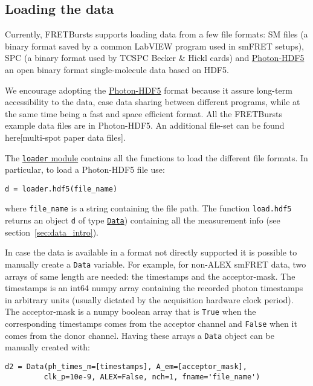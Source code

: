 \subsection{Loading the data}
Currently, FRETBursts supports loading data from a few file formats: SM files (a binary format saved by a common LabVIEW program used in smFRET setups), SPC (a binary format used by TCSPC Becker \& Hickl cards) and \href{http://photon-hdf5.readthedocs.org/}{Photon-HDF5}  an open binary format single-molecule data based on HDF5.

We encourage adopting the  \href{http://photon-hdf5.readthedocs.org/}{Photon-HDF5} format because it assure long-term accessibility to the data, ease data sharing  between different programs, while at the same time being a fast and space efficient format. All the FRETBursts example data files are in Photon-HDF5. An additional file-set can be found here[multi-spot paper data files].

The \href{http://fretbursts.readthedocs.org/en/latest/loader.html}{\texttt{loader} module}
contains all the functions to load the different file formats. In particular, to load a Photon-HDF5 file use:

\begin{verbatim}
d = loader.hdf5(file_name)
\end{verbatim}

where \verb|file_name| is a string containing the file path. The function \verb|load.hdf5| returns an object \verb|d| of type \href{http://fretbursts.readthedocs.org/en/latest/data_class.html}{\texttt{Data}}) containing all the measurement info (see section~\ref{sec:data_intro}).

In case the data is available in a format not directly supported it is possible to manually create a \verb|Data| variable. For example, for non-ALEX smFRET data, two arrays of same length are needed: the timestamps and the acceptor-mask. The timestamps is an int64 numpy array containing the recorded photon timestamps in arbitrary units (usually dictated by the acquisition hardware clock period). The acceptor-mask is a numpy boolean array that is \verb|True| when the corresponding timestamps comes from the acceptor channel and \verb|False| when it comes from the donor channel. Having these arrays a \verb|Data| object can be manually created with:

\begin{verbatim}
d2 = Data(ph_times_m=[timestamps], A_em=[acceptor_mask], 
         clk_p=10e-9, ALEX=False, nch=1, fname='file_name')
\end{verbatim}

